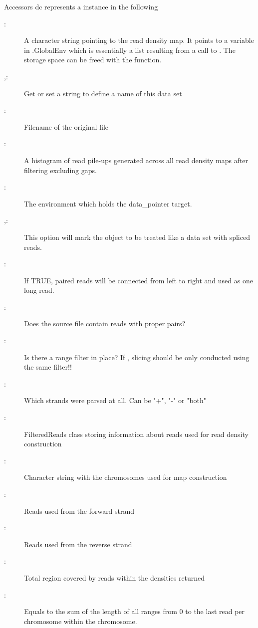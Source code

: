 \documentclass[letterpaper]{book}
\begin{document}
\begin{Section}{Accessors}
dc represents a  instance in the following
\begin{description}

\item[:] A character string pointing to the read density map. 
It points to a variable in .GlobalEnv which is essentially a list resulting from a call to .
The storage space can be freed with the  function. 
\item[,:] Get or set a string to define a name of this data set
\item[:] Filename of the original file
\item[:] A histogram of read pile-ups generated across all read density maps after filtering excluding gaps. 
\item[:] The environment which holds the data\_pointer target. 
\item[,:] This option will mark the object to be treated like a data set with spliced reads.
\item[:] If TRUE, paired reads will be connected from left to right and used as one long read.
\item[:] Does the source file contain reads with proper pairs?  
\item[:] Is there a range filter in place? If , slicing should be only conducted using the same filter!! 
\item[:] Which strands were parsed at all. Can be "+", "-" or "both" 
\item[:] FilteredReads class storing information about reads used for read density construction
\item[:] Character string with the chromosomes used for map construction
\item[:] Reads used from the forward strand
\item[:] Reads used from the reverse strand
\item[:] Total region covered by reads within the densities returned
\item[:] Equals to the sum of the length of all ranges from 0 to the last read per chromosome within the chromosome.

\end{description}
\end{Section}
\end{document}
